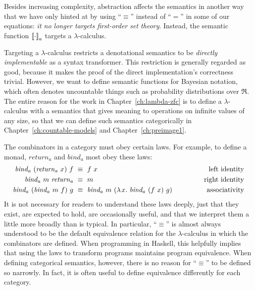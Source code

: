 {Besides increasing complexity, abstraction affects the semantics in another way that we have only hinted at by using ``$\equiv$'' instead of ``$=$'' in some of our equations: \emph{it no longer targets first-order set theory}.
Instead, the semantic function $\left\llbracket{\cdot}\right\rrbracket_a$ targets a $\lambda$-calculus.

Targeting a $\lambda$-calculus restricts a denotational semantics to be \emph{directly implementable} as a syntax transformer.
This restriction is generally regarded as good, because it makes the proof of the direct implementation's correctness trivial.
However, we want to define semantic functions for Bayesian notation, which often denotes uncountable things such as probability distributions over $\Re$.
The entire reason for the work in Chapter~\ref{ch:lambda-zfc} is to define a $\lambda$-calculus with a semantics that gives meaning to operations on infinite values of any size, so that we can define such semantics categorically in Chapter~\ref{ch:countable-models} and Chapter~\ref{ch:preimage1}.

The combinators in a category must obey certain laws.
For example, to define a monad, $\mathit{return_a}$ and $\mathit{bind_a}$ most obey these laws:
\begin{equation}
\begin{aligned}
	\mathit{bind_a}~(\mathit{return_a}~x)~f&\ \equiv\ f~x
		&\text{left identity}
\\
	\mathit{bind_a}~m~\mathit{return_a}&\ \equiv\ m
		&\text{right identity}
\\
	\mathit{bind_a}~(\mathit{bind_a}~m~f)~g&\ \equiv\ \mathit{bind_a}~m~(\fun{x} \mathit{bind_a}~(f~x)~g)
		\hspace{0.5in}&\text{associativity}
\end{aligned}
\end{equation}
It is not necessary for readers to understand these laws deeply, just that they exist, are expected to hold, are occasionally useful, and that we interpret them a little more broadly than is typical.
In particular, ``$\equiv$'' is almost always understood to be the default equivalence relation for the $\lambda$-calculus in which the combinators are defined.
When programming in Haskell, this helpfully implies that using the laws to transform programs maintains program equivalence.
When defining categorical semantics, however, there is no reason for ``$\equiv$'' to be defined so narrowly.
In fact, it is often useful to define equivalence differently for each category.

}
